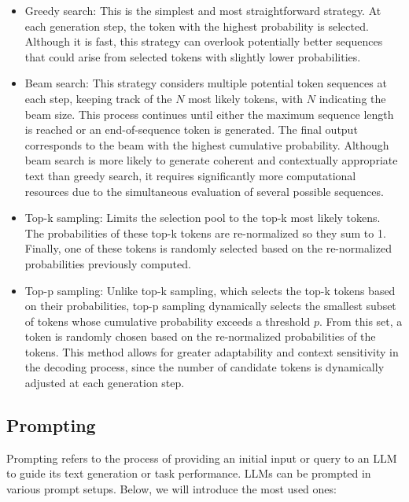 \documentclass[11pt,english,listoffigures,listoftables]{tfgetsinf}
\begin{document}
\begin{itemize}
    \item Greedy search: This is the simplest and most straightforward strategy. At each generation step, the token with the highest probability is selected. Although it is fast, this strategy can overlook potentially better sequences that could arise from selected tokens with slightly lower probabilities. 

    \item Beam search: This strategy considers multiple potential token sequences at each step, keeping track of the $N$ most likely tokens, with $N$ indicating the beam size. This process continues until either the maximum sequence length is reached or an end-of-sequence token is generated. The final output corresponds to the beam with the highest cumulative probability. Although beam search is more likely to generate coherent and contextually appropriate text than greedy search, it requires significantly more computational resources due to the simultaneous evaluation of several possible sequences.

    \item Top-k sampling: Limits the selection pool to the top-k most likely tokens. The probabilities of these top-k tokens are re-normalized so they sum to 1. Finally, one of these tokens is randomly selected based on the re-normalized probabilities previously computed. 

    \item Top-p sampling: Unlike top-k sampling, which selects the top-k tokens based on their probabilities, top-p sampling dynamically selects the smallest subset of tokens whose cumulative probability exceeds a threshold \(p\). From this set, a token is randomly chosen based on the re-normalized probabilities of the tokens. This method allows for greater adaptability and context sensitivity in the decoding process, since the number of candidate tokens is dynamically adjusted at each generation step.
\end{itemize}

\subsection{Prompting}

Prompting refers to the process of providing an initial input or query to an LLM to guide its text generation or task performance. LLMs can be prompted in various prompt setups. Below, we will introduce the most used ones:
\end{document}
